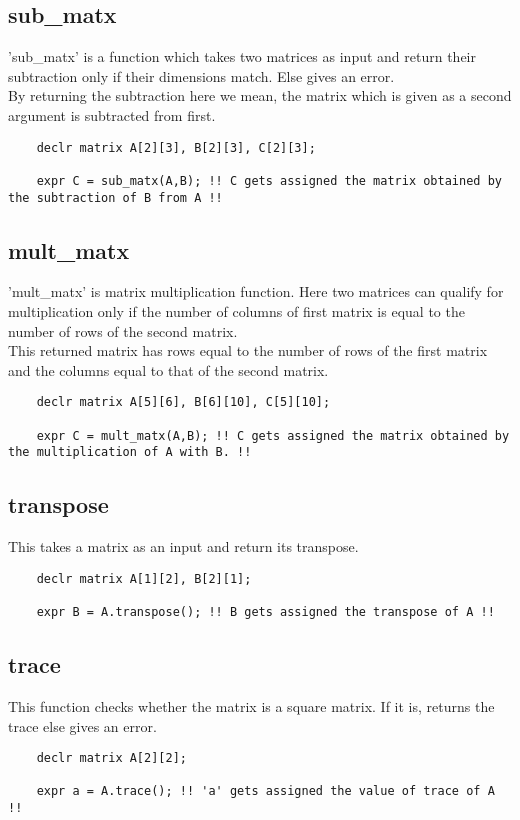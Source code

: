 \documentclass[journal, 18pt]{report}
\begin{document}
\subsection{sub\_matx}
'sub\_matx' is a function which takes two matrices as input and return their subtraction only if their dimensions match. Else gives an error.\\
By returning the subtraction here we mean, the matrix which is given as a second argument is subtracted from first.
\begin{lstlisting}
    declr matrix A[2][3], B[2][3], C[2][3];

    expr C = sub_matx(A,B); !! C gets assigned the matrix obtained by the subtraction of B from A !!
\end{lstlisting}
\subsection{mult\_matx}
'mult\_matx' is matrix multiplication function. Here two matrices can qualify for multiplication only if the number of columns of first matrix is equal to the number of rows of the second matrix.\\
This returned matrix has rows equal to the number of rows of the first matrix and the columns equal to that of the second matrix.\\
\begin{lstlisting}
    declr matrix A[5][6], B[6][10], C[5][10];

    expr C = mult_matx(A,B); !! C gets assigned the matrix obtained by the multiplication of A with B. !!
\end{lstlisting}
\subsection{transpose}
This takes a matrix as an input and return its transpose.\\
\begin{lstlisting}
    declr matrix A[1][2], B[2][1];

    expr B = A.transpose(); !! B gets assigned the transpose of A !!
\end{lstlisting}
\subsection{trace}
This function checks whether the matrix is a square matrix. If it is, returns the trace else gives an error.
\begin{lstlisting}
    declr matrix A[2][2]; 

    expr a = A.trace(); !! 'a' gets assigned the value of trace of A !!
\end{lstlisting}
\end{document}
